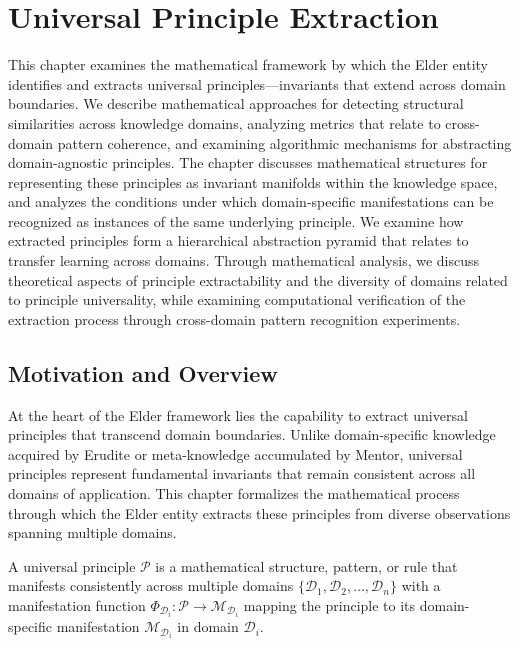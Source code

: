 \chapter{Universal Principle Extraction}

\begin{tcolorbox}[colback=DarkSkyBlue!5!white,colframe=DarkSkyBlue!75!black,title=Chapter Summary]
This chapter examines the mathematical framework by which the Elder entity identifies and extracts universal principles—invariants that extend across domain boundaries. We describe mathematical approaches for detecting structural similarities across knowledge domains, analyzing metrics that relate to cross-domain pattern coherence, and examining algorithmic mechanisms for abstracting domain-agnostic principles. The chapter discusses mathematical structures for representing these principles as invariant manifolds within the knowledge space, and analyzes the conditions under which domain-specific manifestations can be recognized as instances of the same underlying principle. We examine how extracted principles form a hierarchical abstraction pyramid that relates to transfer learning across domains. Through mathematical analysis, we discuss theoretical aspects of principle extractability and the diversity of domains related to principle universality, while examining computational verification of the extraction process through cross-domain pattern recognition experiments.
\end{tcolorbox}

\section{Motivation and Overview}

At the heart of the Elder framework lies the capability to extract universal principles that transcend domain boundaries. Unlike domain-specific knowledge acquired by Erudite or meta-knowledge accumulated by Mentor, universal principles represent fundamental invariants that remain consistent across all domains of application. This chapter formalizes the mathematical process through which the Elder entity extracts these principles from diverse observations spanning multiple domains.

\begin{definition}
A universal principle $\mathcal{P}$ is a mathematical structure, pattern, or rule that manifests consistently across multiple domains $\{\mathcal{D}_1, \mathcal{D}_2, \ldots, \mathcal{D}_n\}$ with a manifestation function $\Phi_{\mathcal{D}_i}: \mathcal{P} \rightarrow \mathcal{M}_{\mathcal{D}_i}$ mapping the principle to its domain-specific manifestation $\mathcal{M}_{\mathcal{D}_i}$ in domain $\mathcal{D}_i$.
\end{definition}

